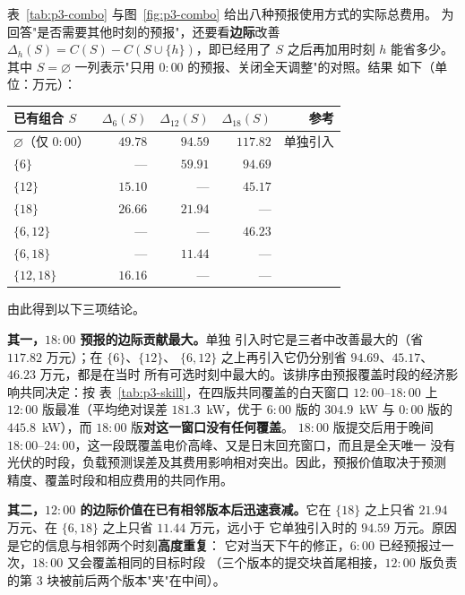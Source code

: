 表~\ref{tab:p3-combo} 与图~\ref{fig:p3-combo} 给出八种预报使用方式的实际总费用。
为回答"是否需要其他时刻的预报"，还要看\textbf{边际}改善
$\Delta_h(S)=C(S)-C(S\cup\{h\})$，即已经用了 $S$ 之后再加用时刻 $h$ 能省多少。
其中 $S=\varnothing$ 一列表示"只用 $0{:}00$ 的预报、关闭全天调整"的对照。结果
如下（单位：万元）：

\begin{center}
\small
\begin{tabular}{lrrrr}
  \toprule
  已有组合 $S$ & $\Delta_{6}(S)$ & $\Delta_{12}(S)$ & $\Delta_{18}(S)$ & 参考 \\
  \midrule
  $\varnothing$（仅 $0{:}00$） & $49.78$ & $94.59$ & $\mathbf{117.82}$ & 单独引入 \\
  $\{6\}$        & ---     & $59.91$ & $\mathbf{94.69}$ & \\
  $\{12\}$       & $15.10$ & ---     & $\mathbf{45.17}$ & \\
  $\{18\}$       & $\mathbf{26.66}$ & $21.94$ & --- & \\
  $\{6,12\}$     & ---     & ---     & $46.23$ & \\
  $\{6,18\}$     & ---     & $11.44$ & --- & \\
  $\{12,18\}$    & $16.16$ & ---     & --- & \\
  \bottomrule
\end{tabular}
\end{center}

由此得到以下三项结论。

\textbf{其一，$18{:}00$ 预报的边际贡献最大。}单独
引入时它是三者中改善最大的（省 $117.82$ 万元）；在 $\{6\}$、$\{12\}$、
$\{6,12\}$ 之上再引入它仍分别省 $94.69$、$45.17$、$46.23$ 万元，都是在当时
所有可选时刻中最大的。该排序由预报覆盖时段的经济影响共同决定：按
表~\ref{tab:p3-skill}，在四版共同覆盖的白天窗口 $12{:}00$--$18{:}00$ 上
$12{:}00$ 版最准（平均绝对误差 $181.3$~kW，优于 $6{:}00$ 版的 $304.9$~kW 与
$0{:}00$ 版的 $445.8$~kW），而 $18{:}00$ 版\textbf{对这一窗口没有任何覆盖}。
$18{:}00$ 版提交后用于晚间
$18{:}00$--$24{:}00$，这一段既覆盖电价高峰、又是日末回充窗口，而且是全天唯一
没有光伏的时段，负载预测误差及其费用影响相对突出。因此，预报价值取决于预测
精度、覆盖时段和相应费用的共同作用。

\textbf{其二，$12{:}00$ 的边际价值在已有相邻版本后迅速衰减。}它在
$\{18\}$ 之上只省 $21.94$ 万元、在 $\{6,18\}$ 之上只省 $11.44$ 万元，远小于
它单独引入时的 $94.59$ 万元。原因是它的信息与相邻两个时刻\textbf{高度重复}：
它对当天下午的修正，$6{:}00$ 已经预报过一次，$18{:}00$ 又会覆盖相同的目标时段
（三个版本的提交块首尾相接，$12{:}00$ 版负责的第 3 块被前后两个版本"夹"在中间）。

